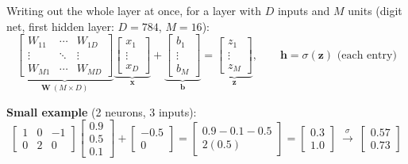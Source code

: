 \begin{keeptogether}
Writing out the whole layer at once, for a layer with $D$ inputs and $M$ units (digit net, first hidden layer: $D = 784$, $M = 16$):
\[
\underbrace{\begin{bmatrix}
W_{11} & \cdots & W_{1D} \\
\vdots & \ddots & \vdots \\
W_{M1} & \cdots & W_{MD}
\end{bmatrix}}_{\mathbf{W}\ (M \times D)}
\underbrace{\begin{bmatrix} x_1 \\ \vdots \\ x_D \end{bmatrix}}_{\mathbf{x}}
+
\underbrace{\begin{bmatrix} b_1 \\ \vdots \\ b_M \end{bmatrix}}_{\mathbf{b}}
=
\underbrace{\begin{bmatrix} z_1 \\ \vdots \\ z_M \end{bmatrix}}_{\mathbf{z}},
\qquad
\mathbf{h} = \sigma(\mathbf{z}) \text{ (each entry)}
\]
\end{keeptogether}

\begin{keeptogether}
\textbf{Small example} (2 neurons, 3 inputs):
\[
\begin{bmatrix} 1 & 0 & -1 \\ 0 & 2 & 0 \end{bmatrix}
\begin{bmatrix} 0.9 \\ 0.5 \\ 0.1 \end{bmatrix}
+
\begin{bmatrix} -0.5 \\ 0 \end{bmatrix}
=
\begin{bmatrix} 0.9 - 0.1 - 0.5 \\ 2(0.5) \end{bmatrix}
=
\begin{bmatrix} 0.3 \\ 1.0 \end{bmatrix}
\ \xrightarrow{\ \sigma\ }\
\begin{bmatrix} 0.57 \\ 0.73 \end{bmatrix}
\]
\end{keeptogether}

